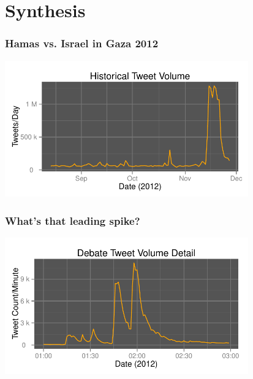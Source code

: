 \documentclass{beamer}
\begin{document}
\section{Synthesis}
{
\begin{frame}
\textcolor{black} {
\hfill \Huge \insertsection}
\end{frame}
}

\begin{frame}\frametitle{Hamas vs. Israel in Gaza 2012}
  \begin{center}
    \includegraphics[width=10.5cm]{./imgs/HI_minimal-all-daily.pdf}
  \end{center}
\end{frame}

\begin{frame}\frametitle{What's that leading spike?}
  \begin{center}
    \includegraphics[width=10.5cm]{./imgs/HI_minimal-leadup-pres-debate.pdf}
  \end{center}
\end{frame}
\end{document}
